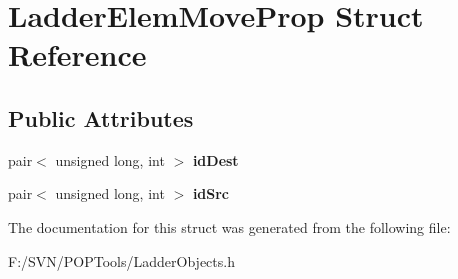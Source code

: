 \hypertarget{struct_ladder_elem_move_prop}{\section{Ladder\-Elem\-Move\-Prop Struct Reference}
\label{struct_ladder_elem_move_prop}
}
\subsection*{Public Attributes}
\begin{DoxyCompactItemize}
\item 
\hypertarget{struct_ladder_elem_move_prop_acda0893434b59d7e40fb5c72c30093f1}{pair$<$ unsigned long, int $>$ {\bfseries id\-Dest}}\label{struct_ladder_elem_move_prop_acda0893434b59d7e40fb5c72c30093f1}

\item 
\hypertarget{struct_ladder_elem_move_prop_aca678dac91f06459e80d146f27836efe}{pair$<$ unsigned long, int $>$ {\bfseries id\-Src}}\label{struct_ladder_elem_move_prop_aca678dac91f06459e80d146f27836efe}

\end{DoxyCompactItemize}


The documentation for this struct was generated from the following file\-:\begin{DoxyCompactItemize}
\item 
F\-:/\-S\-V\-N/\-P\-O\-P\-Tools/Ladder\-Objects.\-h\end{DoxyCompactItemize}
